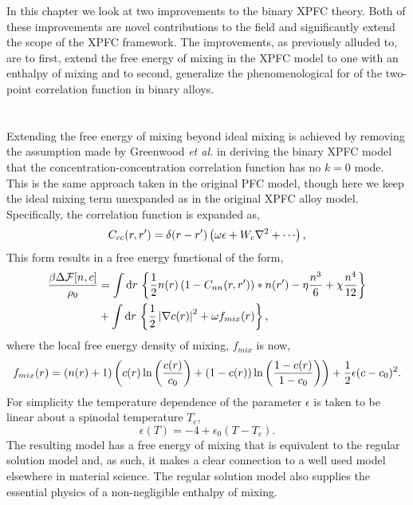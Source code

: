 \label{chapter:improvements}

In this chapter we look at two improvements to the binary XPFC theory. Both of
these improvements are novel contributions to the field and significantly
extend the scope of the XPFC framework. The improvements, as previously alluded
to, are to first, extend the free energy of mixing in the XPFC model to one
with an enthalpy of mixing and to second, generalize the phenomenological
for of the two-point correlation function in binary alloys.

\section{  } %

Extending the free energy of mixing beyond ideal mixing is achieved by removing
the assumption made by Greenwood \textit{et al.} in deriving the binary XPFC
model that the concentration-concentration correlation function has no $k=0$
mode.  This is the same approach taken in the original PFC model, though here
we keep the ideal mixing term unexpanded as in the original XPFC alloy model. 
Specifically, the correlation function is expanded as,
%
\begin{equation}
    C_{cc}(r, r^\prime) = \d(r - r^\prime)
        \l(\omega\epsilon + W_c\nabla^2 + \cdots\r),
\end{equation}
%
 This form results in a free energy functional of the form,
%
\begin{align}
    \frac{\beta\Delta\mathcal{F}[n, c]}{\rho_0} &= \int \mathrm{d}r\, \left\lbrace
        \frac{1}{2} n(r) \left(1 - C_{nn}(r, r^\prime)\right) \ast n(r^\prime)
        - \eta \frac{n^3}{6} + \chi \frac{n^4}{12} \right\rbrace \\
        &+ \int \mathrm{d}r\,\left\lbrace
            \frac{1}{2}\left\vert \nabla c(r) \right\vert^2 + \omega f_{mix}(r)
            \right\rbrace, \nonumber
\end{align}
%
where the local free energy density of mixing, $f_{mix}$ is now,
%
\begin{equation}
    f_{mix}(r) = \left(n(r) + 1\right)\left(
            c(r)\ln\left(\frac{c(r)}{c_0}\right)
          + (1-c(r))\ln\left(\frac{1-c(r)}{1-c_0}\right) \right)
          + \frac{1}{2} \epsilon (c - c_0)^2.
\end{equation}
%
For simplicity the temperature dependence of the parameter $\epsilon$ is taken
to be linear about a spinodal temperature $T_c$,
%
\begin{equation}
    \label{eq:spinodal_model}
    \epsilon(T) = -4 + \epsilon_0(T - T_c).
\end{equation}
%
The resulting model has a free energy of mixing that is equivalent to the
regular solution model and, as such, it makes a clear connection to a well used
model elsewhere in material science. The regular solution model also supplies
the essential physics of a non-negligible enthalpy of mixing. 

